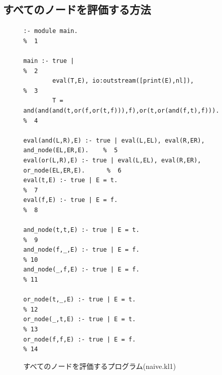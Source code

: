 \documentclass[a4,titlepage]{jsreport}
\begin{document}
\subsection{すべてのノードを評価する方法}

\begin{figure}
\begin{center}
\begin{Verbatim}[baselinestretch=0.8]
% naive.kl1
:- module main.                                                          %  1

main :- true |                                                           %  2
        eval(T,E), io:outstream([print(E),nl]),                          %  3
        T = and(and(and(t,or(f,or(t,f))),f),or(t,or(and(f,t),f))).       %  4

eval(and(L,R),E) :- true | eval(L,EL), eval(R,ER), and_node(EL,ER,E).    %  5
eval(or(L,R),E) :- true | eval(L,EL), eval(R,ER), or_node(EL,ER,E).      %  6
eval(t,E) :- true | E = t.                                               %  7
eval(f,E) :- true | E = f.                                               %  8

and_node(t,t,E) :- true | E = t.                                         %  9
and_node(f,_,E) :- true | E = f.                                         % 10
and_node(_,f,E) :- true | E = f.                                         % 11

or_node(t,_,E) :- true | E = t.                                          % 12
or_node(_,t,E) :- true | E = t.                                          % 13
or_node(f,f,E) :- true | E = f.                                          % 14
\end{Verbatim}
\caption{すべてのノードを評価するプログラム(naive.kl1)}
\label{andor_naive_kl1}
\end{center}
\end{figure}
\end{document}
